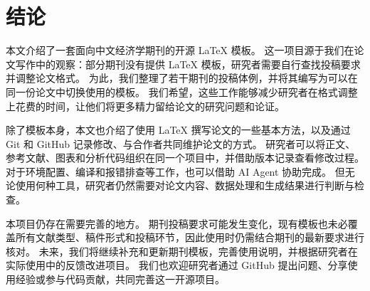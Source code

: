 \section{结论}
\label{sec:conclusion}

本文介绍了一套面向中文经济学期刊的开源 \LaTeX{} 模板。
这一项目源于我们在论文写作中的观察：部分期刊没有提供 \LaTeX{} 模板，研究者需要自行查找投稿要求并调整论文格式。
为此，我们整理了若干期刊的投稿体例，并将其编写为可以在同一份论文中切换使用的模板。
我们希望，这些工作能够减少研究者在格式调整上花费的时间，让他们将更多精力留给论文的研究问题和论证。

除了模板本身，本文也介绍了使用 \LaTeX{} 撰写论文的一些基本方法，以及通过 Git 和 GitHub 记录修改、与合作者共同维护论文的方式。
研究者可以将正文、参考文献、图表和分析代码组织在同一个项目中，并借助版本记录查看修改过程。
对于环境配置、编译和报错排查等工作，也可以借助 AI Agent 协助完成。
但无论使用何种工具，研究者仍然需要对论文内容、数据处理和生成结果进行判断与检查。

本项目仍存在需要完善的地方。
期刊投稿要求可能发生变化，现有模板也未必覆盖所有文献类型、稿件形式和投稿环节，因此使用时仍需结合期刊的最新要求进行核对。
未来，我们将继续补充和更新期刊模板，完善使用说明，并根据研究者在实际使用中的反馈改进项目。
我们也欢迎研究者通过 GitHub 提出问题、分享使用经验或参与代码贡献，共同完善这一开源项目。
